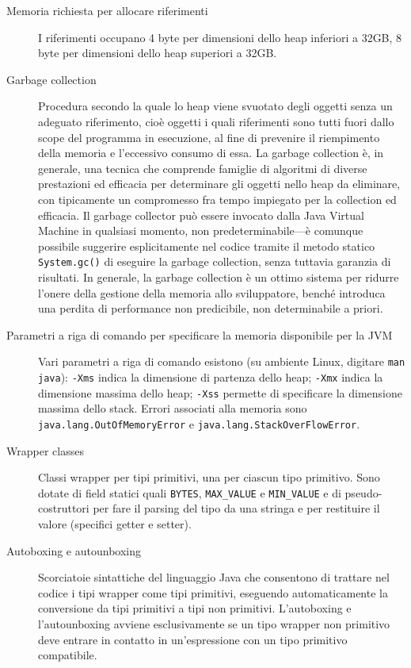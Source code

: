 \documentclass[\fontsizeclass,twocolumn]{\classname}
\theoremstyle{definition}
\theoremstyle{definition}
\begin{document}
\begin{description}
    \item[Memoria richiesta per allocare riferimenti] I riferimenti occupano 4 byte per dimensioni dello heap inferiori a 32GB, 8 byte per dimensioni dello heap superiori a 32GB.
    \item[Garbage collection] Procedura secondo la quale lo heap viene svuotato degli oggetti senza un adeguato riferimento, cioè oggetti i quali riferimenti sono tutti fuori dallo scope del programma in esecuzione, al fine di prevenire il riempimento della memoria e l'eccessivo consumo di essa. La garbage collection è, in generale, una tecnica che comprende famiglie di algoritmi di diverse prestazioni ed efficacia per determinare gli oggetti nello heap da eliminare, con tipicamente un compromesso fra tempo impiegato per la collection ed efficacia. Il garbage collector può essere invocato dalla Java Virtual Machine in qualsiasi momento, non predeterminabile---è comunque possibile suggerire esplicitamente nel codice tramite il metodo statico \texttt{System.gc()} di eseguire la garbage collection, senza tuttavia garanzia di risultati. In generale, la garbage collection è un ottimo sistema per ridurre l'onere della gestione della memoria allo sviluppatore, benché introduca una perdita di performance non predicibile, non determinabile a priori.
    \item[Parametri a riga di comando per specificare la memoria disponibile per la JVM] Vari parametri a riga di comando esistono (su ambiente Linux, digitare \texttt{man java}): \texttt{-Xms} indica la dimensione di partenza dello heap; \texttt{-Xmx} indica la dimensione massima dello heap; \texttt{-Xss} permette di specificare la dimensione massima dello stack. Errori associati alla memoria sono \texttt{java.lang.OutOfMemoryError} e \texttt{java.lang.StackOverFlowError}.
    \item[Wrapper classes] Classi wrapper per tipi primitivi, una per ciascun tipo primitivo. Sono dotate di field statici quali \texttt{BYTES}, \texttt{MAX\_VALUE} e \texttt{MIN\_VALUE} e di pseudo-costruttori per fare il parsing del tipo da una stringa e per restituire il valore (specifici getter e setter).
    \item[Autoboxing e autounboxing] Scorciatoie sintattiche del linguaggio Java che consentono di trattare nel codice i tipi wrapper come tipi primitivi, eseguendo automaticamente la conversione da tipi primitivi a tipi non primitivi. L'autoboxing e l'autounboxing avviene esclusivamente se un tipo wrapper non primitivo deve entrare in contatto in un'espressione con un tipo primitivo compatibile.
\end{description}
\end{document}
